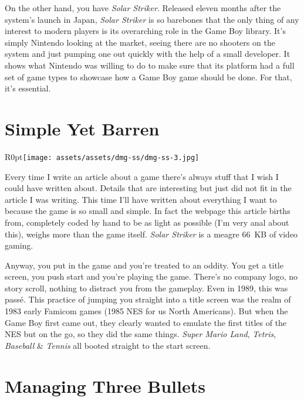 \documentclass{book}
\begin{document}
On the other hand, you have \emph{Solar Striker}. Released eleven months after the system’s launch in Japan, \emph{Solar Striker} is so barebones that the only thing of any interest to modern players is its overarching role in the Game Boy library. It’s simply Nintendo looking at the market, seeing there are no shooters on the system and just pumping one out quickly with the help of a small developer. It shows what Nintendo was willing to do to make sure that its platform had a full set of game types to showcase how a Game Boy game should be done. For that, it’s essential.\par
\FloatBarrier\section*{Simple Yet Barren}
\begin{wrapfigure}{R}{0pt}{\texttt{[image: assets/assets/dmg-ss/dmg-ss-3.jpg]}}\end{wrapfigure}
Every time I write an article about a game there’s always stuff that I wish I could have written about. Details that are interesting but just did not fit in the article I was writing. This time I’ll have written about everything I want to because the game is so small and simple. In fact the webpage this article births from, completely coded by hand to be as light as possible (I’m very anal about this), weighs more than the game itself. \emph{Solar Striker} is a meagre 66~KB of video gaming.\par
Anyway, you put in the game and you’re treated to an oddity. You get a title screen, you push start and you’re playing the game. There’s no company logo, no story scroll, nothing to distract you from the gameplay. Even in 1989, this was passé. This practice of jumping you straight into a title screen was the realm of 1983 early Famicom games (1985 NES for us North Americans). But when the Game Boy first came out, they clearly wanted to emulate the first titles of the NES but on the go, so they did the same things. \emph{Super Mario Land}, \emph{Tetris}, \emph{Baseball} \& \emph{Tennis} all booted straight to the start screen.\par
\FloatBarrier\section*{Managing Three Bullets}
\FloatBarrier\vspace{\baselineskip}\begin{figure}[H]\end{figure}
\end{document}
